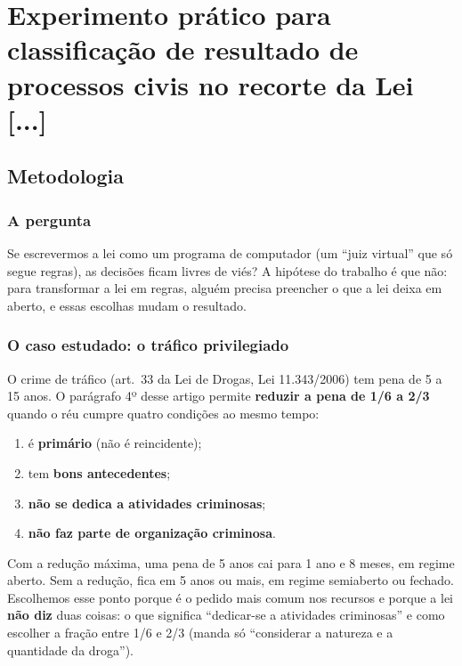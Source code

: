 \chapter{Experimento prático para classificação de resultado de processos civis no recorte da Lei [...]}
\label{cap:conc}

\section{Metodologia}

\subsection*{A pergunta}

Se escrevermos a lei como um programa de computador (um ``juiz virtual'' que só segue
regras), as decisões ficam livres de viés? A hipótese do trabalho é que não: para
transformar a lei em regras, alguém precisa preencher o que a lei deixa em aberto, e
essas escolhas mudam o resultado.

\subsection*{O caso estudado: o tráfico privilegiado}

O crime de tráfico (art.~33 da Lei de Drogas, Lei 11.343/2006) tem pena de 5 a 15 anos.
O parágrafo 4º desse artigo permite \textbf{reduzir a pena de 1/6 a 2/3} quando o réu
cumpre quatro condições ao mesmo tempo:
\begin{enumerate}
  \item é \textbf{primário} (não é reincidente);
  \item tem \textbf{bons antecedentes};
  \item \textbf{não se dedica a atividades criminosas};
  \item \textbf{não faz parte de organização criminosa}.
\end{enumerate}
Com a redução máxima, uma pena de 5 anos cai para 1 ano e 8 meses, em regime aberto.
Sem a redução, fica em 5 anos ou mais, em regime semiaberto ou fechado.
Escolhemos esse ponto porque é o pedido mais comum nos recursos e porque a lei
\textbf{não diz} duas coisas: o que significa ``dedicar-se a atividades criminosas'' e
como escolher a fração entre 1/6 e 2/3 (manda só ``considerar a natureza e a quantidade
da droga'').

